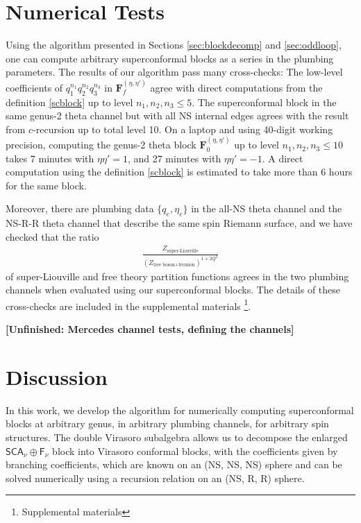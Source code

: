 \documentclass[aps,10pt,twocolumn,superscriptaddress]{revtex4-2}
\def\ie{\begin{equation}\begin{aligned}}
\def\fe{\end{aligned}\end{equation}}
\begin{document}
\section{Numerical Tests}

\label{sec:numerics}

Using the algorithm presented in Sections \ref{sec:blockdecomp} and \ref{sec:oddloop}, one can compute arbitrary superconformal blocks as a series in the plumbing parameters. The results of our algorithm pass many cross-checks: The low-level coefficients of $q_1^{n_1}q_2^{n_2}q_3^{n_3}$ in $\mathbf{F}_f^{(\eta, \eta')}$ agree with direct computations from the definition \eqref{scblock} up to level $n_1, n_2, n_3\leq 5$. The superconformal block in the same genus-2 theta channel but with all NS internal edges agrees with the result from $c$-recursion \cite{Belavin:2018hfm} up to total level 10. On a laptop and using 40-digit working precision, computing the genus-2 theta block $\mathbf{F}_0^{(\eta, \eta')}$ up to level $n_1, n_2, n_3\leq 10$ takes 7 minutes with $\eta \eta'=1$, and 27 minutes with $\eta \eta'=-1$. A direct computation using the definition \eqref{scblock} is estimated to take more than 6 hours for the same block.

Moreover, there are plumbing data $\{q_e, \eta_e\}$ in the all-NS theta channel and the NS-R-R theta channel that describe the same spin Riemann surface, and we have checked that the ratio
\ie 
\frac{Z_\text{super-Liouville}}{(Z_{\text{free boson+fermion}})^{1+2Q^2}}
\fe
of super-Liouville and free theory partition functions agrees in the two plumbing channels when evaluated using our superconformal blocks. The details of these cross-checks are included in the supplemental materials \footnote{Supplemental materials}.

\textbf{[Unfinished: Mercedes channel tests, defining the channels]}

\section{Discussion}

\label{sec:disc}

In this work, we develop the algorithm for numerically computing superconformal blocks at arbitrary genus, in arbitrary plumbing channels, for arbitrary spin structures. The double Virasoro subalgebra allows us to decompose the enlarged $\mathsf{SCA}_\nu \oplus \mathsf{F}_\nu$ block into Virasoro conformal blocks, with the coefficients given by branching coefficients, which are known on an (NS, NS, NS) sphere and can be solved numerically using a recursion relation on an (NS, R, R) sphere.
\end{document}
